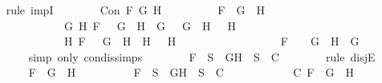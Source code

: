\begin{isabellebody}
\ \ \ \ \isamarkupfalse%
\ {\isacharparenleft}rule\ impI{\isacharparenright}\isanewline
\ \ \ \ \ \ \isamarkupfalse%
\ {\isachardoublequoteopen}Con\ F\ G\ H{\isachardoublequoteclose}\isanewline
\ \ \ \ \ \ \isamarkupfalse%
\ \isamarkupfalse%
\ {\isachardoublequoteopen}F\ {\isacharequal}\ G\ \isactrlbold {\isasymand}\ H\ {\isasymor}\ \isanewline
\ \ \ \ \ \ \ \ \ \ \ \ \ \ \ \ {\isacharparenleft}{\isacharparenleft}{\isasymexists}G{}\ H{}{\isachardot}\ F\ {\isacharequal}\ \isactrlbold {\isasymnot}\ {\isacharparenleft}G{}\ \isactrlbold {\isasymor}\ H{}{\isacharparenright}\ {\isasymand}\ G\ {\isacharequal}\ \isactrlbold {\isasymnot}\ G{}\ {\isasymand}\ H\ {\isacharequal}\ \isactrlbold {\isasymnot}\ H{}{\isacharparenright}\ {\isasymor}\ \isanewline
\ \ \ \ \ \ \ \ \ \ \ \ \ \ \ \ {\isacharparenleft}{\isasymexists}H{}{\isachardot}\ F\ {\isacharequal}\ \isactrlbold {\isasymnot}\ {\isacharparenleft}G\ \isactrlbold {\isasymrightarrow}\ H{}{\isacharparenright}\ {\isasymand}\ H\ {\isacharequal}\ \isactrlbold {\isasymnot}\ H{}{\isacharparenright}\ {\isasymor}\ \isanewline
\ \ \ \ \ \ \ \ \ \ \ \ \ \ \ \ F\ {\isacharequal}\ \isactrlbold {\isasymnot}\ {\isacharparenleft}\isactrlbold {\isasymnot}\ G{\isacharparenright}\ {\isasymand}\ H\ {\isacharequal}\ G{\isacharparenright}{\isachardoublequoteclose}\isanewline
\ \ \ \ \ \ \ \ \isamarkupfalse%
\ {\isacharparenleft}simp\ only{\isacharcolon}\ con{\isacharunderscore}dis{\isacharunderscore}simps{\isacharparenleft}{}{\isacharparenright}{\isacharparenright}\isanewline
\ \ \ \ \ \ \isamarkupfalse%
\ {\isachardoublequoteopen}F\ {\isasymin}\ S\ {\isasymlongrightarrow}\ {\isacharbraceleft}G{\isacharcomma}H{\isacharbraceright}\ {\isasymunion}\ S\ {\isasymin}\ C{\isachardoublequoteclose}\isanewline
\ \ \ \ \ \ \isamarkupfalse%
\ {\isacharparenleft}rule\ disjE{\isacharparenright}\isanewline
\ \ \ \ \ \ \ \ \isamarkupfalse%
\ {\isachardoublequoteopen}F\ {\isacharequal}\ G\ \isactrlbold {\isasymand}\ H{\isachardoublequoteclose}\isanewline
\ \ \ \ \ \ \ \ \isamarkupfalse%
\ {\isachardoublequoteopen}F\ {\isasymin}\ S\ {\isasymlongrightarrow}\ {\isacharbraceleft}G{\isacharcomma}H{\isacharbraceright}\ {\isasymunion}\ S\ {\isasymin}\ C{\isachardoublequoteclose}\isanewline
\ \ \ \ \ \ \ \ \ \ \isamarkupfalse%
\ C{}\ {\isacartoucheopen}F\ {\isacharequal}\ G\ \isactrlbold {\isasymand}\ H{\isacartoucheclose}\ \isamarkupfalse%

\end{isabellebody}
